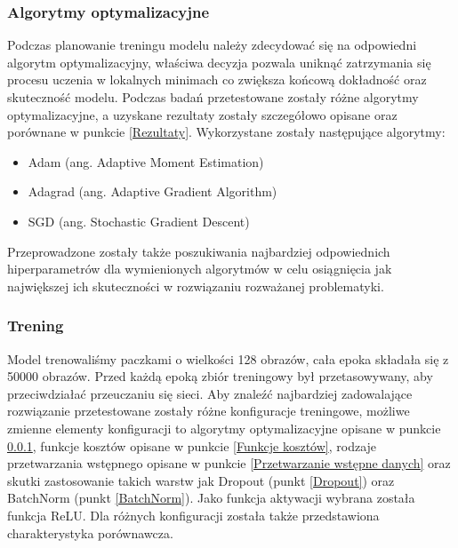 \subsubsection{Algorytmy optymalizacyjne} \label{Algorytmy optymalizacyjne}
  Podczas planowanie treningu modelu należy zdecydować się na odpowiedni
  algorytm optymalizacyjny, właściwa decyzja pozwala uniknąć zatrzymania się
  procesu uczenia w lokalnych minimach co zwiększa końcową dokładność oraz
  skuteczność modelu.
  Podczas badań przetestowane zostały różne algorytmy optymalizacyjne,
  a uzyskane rezultaty zostały szczegółowo opisane oraz porównane w punkcie
  \ref{Rezultaty}.\newline
  Wykorzystane zostały następujące algorytmy:
  \begin{itemize}
    \item Adam (ang. Adaptive Moment Estimation)
    \item Adagrad (ang. Adaptive Gradient Algorithm)
    \item SGD (ang. Stochastic Gradient Descent)
  \end{itemize}

  \noindent
  Przeprowadzone zostały także poszukiwania najbardziej odpowiednich hiperparametrów
  dla wymienionych algorytmów w celu osiągnięcia jak największej ich skuteczności
  w rozwiązaniu rozważanej problematyki.

\subsubsection{Trening}

Model trenowaliśmy paczkami o wielkości 128 obrazów, cała epoka składała się z
50000 obrazów. Przed każdą epoką zbiór treningowy był przetasowywany, aby
przeciwdziałać przeuczaniu się sieci. Aby znaleźć najbardziej zadowalające rozwiązanie
przetestowane zostały różne konfiguracje treningowe, możliwe zmienne elementy
konfiguracji to algorytmy optymalizacyjne opisane w punkcie
\ref{Algorytmy optymalizacyjne}, funkcje kosztów opisane w punkcie \ref{Funkcje kosztów},
rodzaje przetwarzania wstępnego opisane w punkcie \ref{Przetwarzanie wstępne danych} oraz
skutki zastosowanie takich warstw jak Dropout (punkt \ref{Dropout}) oraz BatchNorm
(punkt \ref{BatchNorm}). Jako funkcja aktywacji wybrana została funkcja ReLU.
Dla różnych konfiguracji została także przedstawiona charakterystyka porównawcza.


